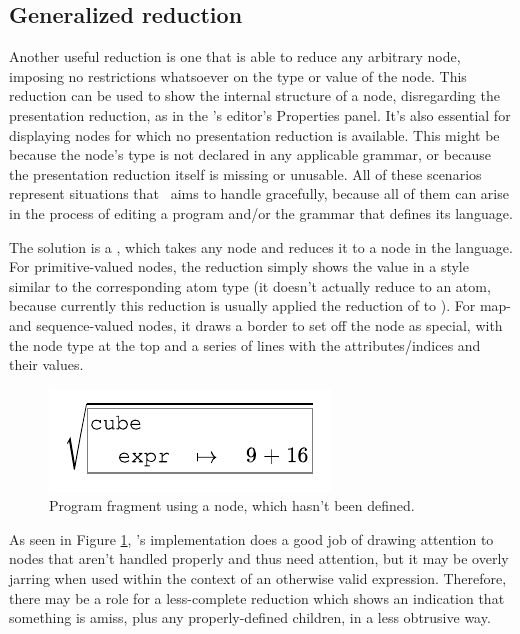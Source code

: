 \subsection{Generalized reduction}
Another useful reduction is one that is able to reduce any arbitrary node, imposing no restrictions whatsoever on the type or value of the node. This reduction can be used to show the internal structure of a node, disregarding the presentation reduction, as in the \Meta's editor's Properties panel. It's also essential for displaying nodes for which no presentation reduction is available. This might be because the node's type is not declared in any applicable grammar, or because the presentation reduction itself is missing or unusable. All of these scenarios represent situations that \Meta\ aims to handle gracefully, because all of them can arise in the process of editing a program and/or the grammar that defines its language.

The solution is a , which takes any node and reduces it to a node in the  language. For primitive-valued nodes, the reduction simply shows the value in a style similar to the corresponding  atom type (it doesn't actually reduce to an atom, because currently this reduction is usually applied  the reduction of  to ). For map- and sequence-valued nodes, it draws a border to set off the node as special, with the node type at the top and a series of lines with the attributes/indices and their values.

\begin{figure}[h]
  \begin{center}
  \includegraphics{src/image/gen.pdf}
  \end{center}
  \caption{Program fragment using a  node, which hasn't been defined.}
  \label{fig-general}
\end{figure}

As seen in Figure \ref{fig-general}, \Meta's implementation does a good job of drawing attention to nodes that aren't handled properly and thus need attention, but it may be overly jarring when used within the context of an otherwise valid expression. Therefore, there may be a role for a less-complete reduction which shows an indication that something is amiss, plus any properly-defined children, in a less obtrusive way.


